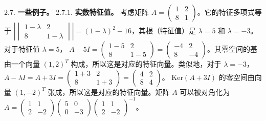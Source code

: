 2.7. \textbf{一些例子。}
2.7.1. \textbf{实数特征值。} 考虑矩阵 $A = \begin{pmatrix} 1 & 2 \\ 8 & 1 \end{pmatrix}$。它的特征多项式等于 $|\begin{vmatrix} 1-\lambda & 2 \\ 8 & 1-\lambda \end{vmatrix}| = (1-\lambda)^2 - 16$，其根（特征值）是 $\lambda = 5$ 和 $\lambda = -3$。对于特征值 $\lambda = 5$， $A - 5I = \begin{pmatrix} 1-5 & 2 \\ 8 & 1-5 \end{pmatrix} = \begin{pmatrix} -4 & 2 \\ 8 & -4 \end{pmatrix}$。其零空间的基由一个向量 $(1, 2)^T$ 构成，所以这是对应的特征向量。类似地，对于 $\lambda = -3$， $A - \lambda I = A + 3I = \begin{pmatrix} 1+3 & 2 \\ 8 & 1+3 \end{pmatrix} = \begin{pmatrix} 4 & 2 \\ 8 & 4 \end{pmatrix}$。
Ker$(A + 3I)$ 的零空间由向量 $(1, -2)^T$ 张成，所以这是对应的特征向量。矩阵 $A$ 可以被对角化为
$A = \begin{pmatrix} 1 & 1 \\ 2 & -2 \end{pmatrix} \begin{pmatrix} 5 & 0 \\ 0 & -3 \end{pmatrix} \begin{pmatrix} 1 & 1 \\ 2 & -2 \end{pmatrix}^{-1}$。

